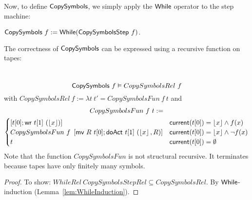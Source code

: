 Now, to define $\MS{CopySymbols}$, we simply apply the $\textsf{While}$ operator to the step machine:
\begin{definition}[$\MS{CopySymbols}$]
  \label{def:CopySymbols}
  $\textsf{CopySymbols}~f := \textsf{While}(\textsf{CopySymbolsStep}~f)$.
\end{definition}

The correctness of $\MS{CopySymbols}$ can be expressed using a recursive function on tapes:
\begin{lemma}
  \label{lem:CopySymbols_Realise}
  \
  $$\textsf{CopySymbols}~f \vDash CopySymbolsRel~f$$
  with $CopySymbolsRel~f := \lambda t~t' = CopySymbolsFun~f~t$ and
  \begin{multline*}
    CopySymbolsFun~f~t :=\\
    \begin{cases}
      \left[ t[0]; \textsf{wr}~t[1]~(\left\lfloor {x} \right\rfloor) \right]                                  & \textsf{current}(t[0])=\left\lfloor {x} \right\rfloor \land f(x) \\
      CopySymbolsFun~f~\left[ \textsf{mv}~R~t[0]; \textsf{doAct}~t[1]~(\left\lfloor {x} \right\rfloor, R) \right] & \textsf{current}(t[0])=\left\lfloor {x} \right\rfloor \land \lnot f(x) \\
      t                                                                       & \textsf{current}(t[0])=\emptyset
    \end{cases}
  \end{multline*}
  Note that the function $CopySymbolsFun$ is not structural recursive.  It terminates because tapes have only finitely many symbols.
\end{lemma}
\begin{proof}
  To show: $WhileRel~CopySymbolsStepRel \subseteq CopySymbolsRel$.  By $\textsf{While}$-induction (Lemma~\ref{lem:WhileInduction}).
\end{proof}

